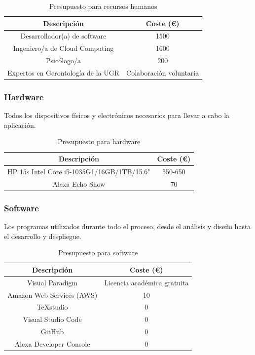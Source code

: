 \begin{table}[H]
    \centering
    \begin{tabular}{|c|c|}
    \hline
    \rowcolor{lightgray}
    \textbf{Descripción} & \textbf{Coste (€)}\\
    \hline
    Desarrollador(a) de software & 1500 \\
    \hline
    Ingeniero/a de Cloud Computing & 1600 \\
    \hline
    Psicólogo/a & 200 \\
    \hline
    Expertos en Gerontología de la UGR & Colaboración voluntaria \\
    \hline
    \end{tabular}
    \caption{Presupuesto para recursos humanos}
    \label{tab:presupuesto-personal}
\end{table}

\subsubsection{Hardware}
Todos los dispositivos físicos y electrónicos necesarios para llevar a cabo la aplicación.

\begin{table}[H]
    \centering
    \begin{tabular}{|c|c|}
    \hline
    \rowcolor{lightgray}
    \textbf{Descripción} & \textbf{Coste (€)}\\
    \hline
    HP 15s Intel Core i5-1035G1/16GB/1TB/15.6" & 550-650 \\
    \hline
    Alexa Echo Show & 70 \\
    \hline
    \end{tabular}
    \caption{Presupuesto para hardware}
    \label{tab:presupuesto-hw}
\end{table}

\subsubsection{Software}
Los programas utilizados durante todo el proceso, desde el análisis y diseño hasta el desarrollo y despliegue.  

\begin{table}[H]
    \centering
    \begin{tabular}{|c|c|}
    \hline
    \rowcolor{lightgray}
    \textbf{Descripción} & \textbf{Coste (€)}\\
    \hline
    Visual Paradigm & Licencia académica gratuita \\
    \hline
    Amazon Web Services (AWS) & 10 \\
    \hline
    TeXstudio & 0 \\
    \hline
    Visual Studio Code & 0 \\
    \hline
    GitHub & 0 \\
    \hline
    Alexa Developer Console & 0 \\
    \hline
    \end{tabular}
    \caption{Presupuesto para software}
    \label{tab:presupuesto-sw}
\end{table}

